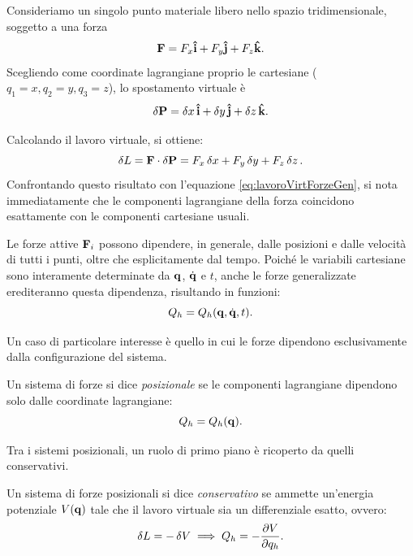 \begin{example}
    Consideriamo un singolo punto materiale libero nello spazio tridimensionale, soggetto a una forza 
    \begin{equation*}
        \vb{F} = F_x \vu{i} + F_y \vu{j} + F_z \vu{k}.
    \end{equation*}
    Scegliendo come coordinate lagrangiane proprio le cartesiane ($q_1=x, q_2=y, q_3=z$), lo spostamento virtuale è $$\var{\vb{P}} = \var{x}\vu{i} + \var{y}\vu{j} + \var{z}\vu{k}.$$
    
    Calcolando il lavoro virtuale, si ottiene:
    \begin{equation*}
        \var{L} = \vb{F} \cdot \var{\vb{P}} = F_x \var{x} + F_y \var{y} + F_z \var{z}.
    \end{equation*}
    Confrontando questo risultato con l'equazione \eqref{eq:lavoroVirtForzeGen}, si nota immediatamente che le componenti lagrangiane della forza coincidono esattamente con le componenti cartesiane usuali.
\end{example}

Le forze attive $\vb{F}_i$ possono dipendere, in generale, dalle posizioni e dalle velocità di tutti i punti, oltre che esplicitamente dal tempo. Poiché le variabili cartesiane sono interamente determinate da $\vb{q}$, $\dot{\vb{q}}$ e $t$, anche le forze generalizzate erediteranno questa dipendenza, risultando in funzioni:
\begin{equation*}
    Q_h = Q_h(\vb{q}, \dot{\vb{q}}, t).
\end{equation*}

Un caso di particolare interesse è quello in cui le forze dipendono esclusivamente dalla configurazione del sistema.
\begin{definition}
    Un sistema di forze si dice \emph{posizionale} se le componenti lagrangiane dipendono solo dalle coordinate lagrangiane:
    \begin{equation*}
        Q_h = Q_h(\vb{q}).
    \end{equation*}
\end{definition}

Tra i sistemi posizionali, un ruolo di primo piano è ricoperto da quelli conservativi.
\begin{definition}
    Un sistema di forze posizionali si dice \emph{conservativo} se ammette un'energia potenziale $V(\vb{q})$ tale che il lavoro virtuale sia un differenziale esatto, ovvero:
    \begin{equation*}
        \var{L} = -\var{V} \implies Q_h = -\pdv{V}{q_h}.
    \end{equation*}
\end{definition}

